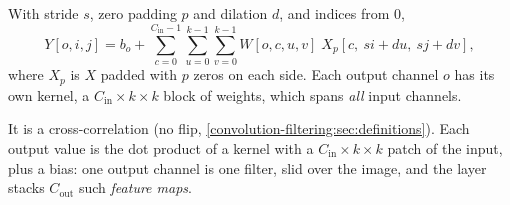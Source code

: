\begin{notechapter}
\begin{definition}\label{convolutional-layers:def:conv}
With stride $s$, zero padding $p$ and dilation $d$, and indices from $0$,
\[
  Y[o,i,j] = b_o + \sum_{c=0}^{C_{\mathrm{in}}-1}\sum_{u=0}^{k-1}\sum_{v=0}^{k-1}W[o,c,u,v]\;X_p[c,\ si + du,\ sj + dv],
\]
where $X_p$ is $X$ padded with $p$ zeros on each side. Each output channel $o$ has its own
kernel, a $C_{\mathrm{in}}\times k\times k$ block of weights, which spans \emph{all} input channels.
\end{definition}

It is a cross-correlation (no flip, \cref{convolution-filtering:sec:definitions}). Each output
value is the dot product of a kernel with a $C_{\mathrm{in}}\times k\times k$ patch of the input, plus a bias: one output channel is one
filter, slid over the image, and the layer stacks $C_{\mathrm{out}}$ such \emph{feature maps}.


\end{notechapter}

